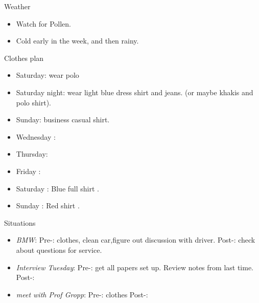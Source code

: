 \documentclass[serif, mathserif, final]{beamer}
\begin{document}
\begin{frame}{}
\begin{columns}
\begin{column}{0.20\linewidth}
\begin{block}{Weather} 
  \begin{itemize}
  \tiny \item \tiny Watch for Pollen.
  \item \tiny Cold early in the week, and then rainy. 
  \end{itemize}
\end{block} 

  \begin{block}{Clothes plan} 
    \begin{itemize} 
      \tiny \item \tiny Saturday: wear polo 
    \item \tiny Saturday night: wear light blue dress shirt and jeans. (or maybe khakis and polo shirt). 
    \item \tiny Sunday: business casual shirt. 
    \item \tiny Wednesday : 
    \item \tiny Thursday: 
    \item \tiny Friday : 
    \item \tiny Saturday : Blue full shirt . 
    \item \tiny Sunday : Red shirt .
    \end{itemize} 
  \end{block}

  \begin{block}{Situations} 
    \begin{itemize} 

      \item \tiny \textit{BMW}: Pre-: clothes, clean car,figure out
        discussion with driver.  Post-:  check
        about questions for service. 


      \item \tiny \textit{Interview Tuesday}: Pre-: get all papers set
        up.  Review notes from last time. Post-:  
    \item \tiny \textit{meet with Prof Gropp}: Pre-: clothes  Post-:  
    \end{itemize}
  \end{block}
\end{column}%
\end{columns}

\end{frame}
\end{document}
